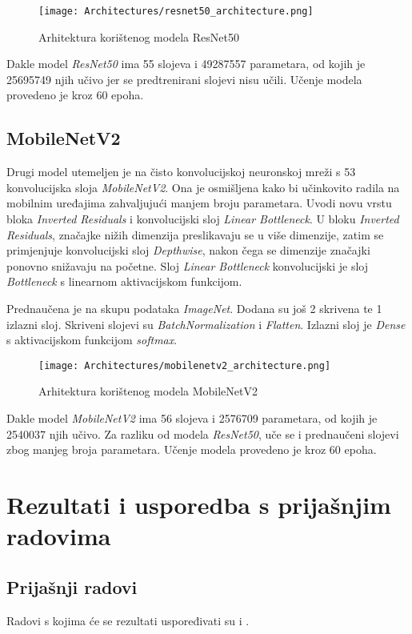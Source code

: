\documentclass[conference, utf8]{IEEEtran}
\begin{document}
 	\begin{figure}[H]
		\centering
		\texttt{[image: Architectures/resnet50\_architecture.png]}
		\caption{Arhitektura korištenog modela ResNet50}
		\label{fig:resnet50model}
	\end{figure}
	
		
	Dakle model \textit{ResNet50} ima 55 slojeva i 49287557 parametara, od kojih je 25695749 njih učivo jer se predtrenirani slojevi nisu učili. Učenje modela provedeno je kroz 60 epoha.
	
	
	\subsection{MobileNetV2}
	Drugi model utemeljen je na čisto konvolucijskoj neuronskoj mreži s 53 konvolucijska sloja \textit{MobileNetV2}. Ona je osmišljena kako bi učinkovito radila na mobilnim uređajima zahvaljujući manjem broju parametara. Uvodi novu vrstu bloka \textit{Inverted Residuals} i konvolucijski sloj \textit{Linear Bottleneck}. U bloku \textit{Inverted Residuals}, značajke nižih dimenzija preslikavaju se u više dimenzije, zatim se primjenjuje konvolucijski sloj \textit{Depthwise}, nakon čega se dimenzije značajki ponovno snižavaju na početne. Sloj \textit{Linear Bottleneck} konvolucijski je sloj \textit{Bottleneck} s linearnom aktivacijskom funkcijom.
	
	Prednaučena je na skupu podataka \textit{ImageNet}. Dodana su još 2 skrivena te 1 izlazni sloj. Skriveni slojevi su \textit{BatchNormalization} i \textit{Flatten}. Izlazni sloj je \textit{Dense} s aktivacijskom funkcijom \textit{softmax}.
	
	\begin{figure}[H]
		\centering
		\texttt{[image: Architectures/mobilenetv2\_architecture.png]}
		\caption{Arhitektura korištenog modela MobileNetV2}
		\label{fig:mobilenetv2model}
	\end{figure}
	
	Dakle model \textit{MobileNetV2} ima 56 slojeva i 2576709 parametara, od kojih je 2540037 njih učivo. Za razliku od modela \textit{ResNet50}, uče se i prednaučeni slojevi zbog manjeg broja parametara. Učenje modela provedeno je kroz 60 epoha.
	
	\section{Rezultati i usporedba s prijašnjim radovima}
	\subsection{Prijašnji radovi}
	Radovi s kojima će se rezultati uspoređivati su \cite{RAD1} i \cite{RAD2}. 
	
\end{document}
